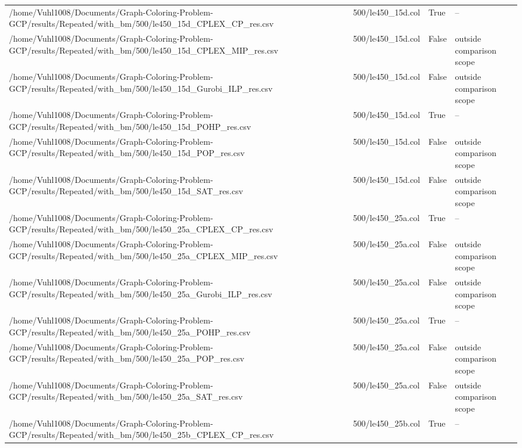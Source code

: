 \begin{table}[htbp]
\begin{tabular}{llll}
/home/Vuhl1008/Documents/Graph-Coloring-Problem-GCP/results/Repeated/with\_bm/500/le450\_15d\_CPLEX\_CP\_res.csv & 500/le450\_15d.col & True & -- \\
/home/Vuhl1008/Documents/Graph-Coloring-Problem-GCP/results/Repeated/with\_bm/500/le450\_15d\_CPLEX\_MIP\_res.csv & 500/le450\_15d.col & False & outside comparison scope \\
/home/Vuhl1008/Documents/Graph-Coloring-Problem-GCP/results/Repeated/with\_bm/500/le450\_15d\_Gurobi\_ILP\_res.csv & 500/le450\_15d.col & False & outside comparison scope \\
/home/Vuhl1008/Documents/Graph-Coloring-Problem-GCP/results/Repeated/with\_bm/500/le450\_15d\_POHP\_res.csv & 500/le450\_15d.col & True & -- \\
/home/Vuhl1008/Documents/Graph-Coloring-Problem-GCP/results/Repeated/with\_bm/500/le450\_15d\_POP\_res.csv & 500/le450\_15d.col & False & outside comparison scope \\
/home/Vuhl1008/Documents/Graph-Coloring-Problem-GCP/results/Repeated/with\_bm/500/le450\_15d\_SAT\_res.csv & 500/le450\_15d.col & False & outside comparison scope \\
/home/Vuhl1008/Documents/Graph-Coloring-Problem-GCP/results/Repeated/with\_bm/500/le450\_25a\_CPLEX\_CP\_res.csv & 500/le450\_25a.col & True & -- \\
/home/Vuhl1008/Documents/Graph-Coloring-Problem-GCP/results/Repeated/with\_bm/500/le450\_25a\_CPLEX\_MIP\_res.csv & 500/le450\_25a.col & False & outside comparison scope \\
/home/Vuhl1008/Documents/Graph-Coloring-Problem-GCP/results/Repeated/with\_bm/500/le450\_25a\_Gurobi\_ILP\_res.csv & 500/le450\_25a.col & False & outside comparison scope \\
/home/Vuhl1008/Documents/Graph-Coloring-Problem-GCP/results/Repeated/with\_bm/500/le450\_25a\_POHP\_res.csv & 500/le450\_25a.col & True & -- \\
/home/Vuhl1008/Documents/Graph-Coloring-Problem-GCP/results/Repeated/with\_bm/500/le450\_25a\_POP\_res.csv & 500/le450\_25a.col & False & outside comparison scope \\
/home/Vuhl1008/Documents/Graph-Coloring-Problem-GCP/results/Repeated/with\_bm/500/le450\_25a\_SAT\_res.csv & 500/le450\_25a.col & False & outside comparison scope \\
/home/Vuhl1008/Documents/Graph-Coloring-Problem-GCP/results/Repeated/with\_bm/500/le450\_25b\_CPLEX\_CP\_res.csv & 500/le450\_25b.col & True & -- \\

\end{tabular}
\end{table}
